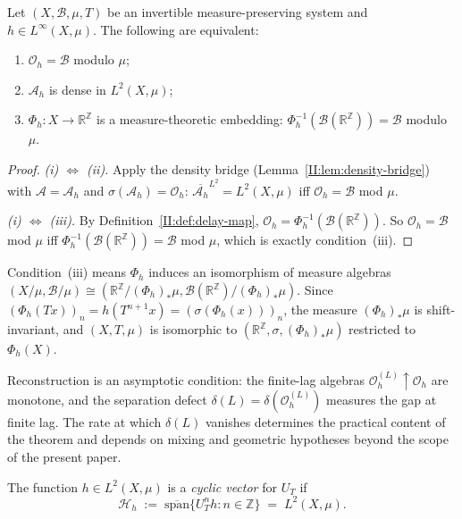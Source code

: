 \begin{theorem}
\label{II:thm:reconstruction}
Let $(X, \mathcal{B}, \mu, T)$ be an invertible measure-preserving system and
$h \in L^\infty(X, \mu)$.  The following are equivalent:
\begin{enumerate}[label=(\roman*)]
  \item $\mathcal{O}_h = \mathcal{B}$ modulo $\mu$;
  \item $\mathcal{A}_h$ is dense in $L^2(X, \mu)$;
  \item $\Phi_h : X \to \mathbb{R}^\mathbb{Z}$ is a measure-theoretic embedding:
    $\Phi_h^{-1}(\mathcal{B}(\mathbb{R}^\mathbb{Z})) = \mathcal{B}$ modulo $\mu$.
\end{enumerate}
\end{theorem}

\begin{proof}
\emph{(i) $\Leftrightarrow$ (ii).}
Apply the density bridge (Lemma~\ref{II:lem:density-bridge}) with
$\mathcal{A} = \mathcal{A}_h$ and $\sigma(\mathcal{A}_h) = \mathcal{O}_h$:
$\overline{\mathcal{A}_h}^{L^2} = L^2(X, \mu)$ iff $\mathcal{O}_h = \mathcal{B}$
mod $\mu$.

\emph{(i) $\Leftrightarrow$ (iii).}
By Definition~\ref{II:def:delay-map},
$\mathcal{O}_h = \Phi_h^{-1}(\mathcal{B}(\mathbb{R}^\mathbb{Z}))$.
So $\mathcal{O}_h = \mathcal{B}$ mod $\mu$ iff
$\Phi_h^{-1}(\mathcal{B}(\mathbb{R}^\mathbb{Z})) = \mathcal{B}$ mod $\mu$,
which is exactly condition~(iii).
\end{proof}

Condition~(iii) means $\Phi_h$ induces an isomorphism of measure algebras
$(X/\mu, \mathcal{B}/\mu) \cong (\mathbb{R}^\mathbb{Z}/(\Phi_h)_*\mu,
\mathcal{B}(\mathbb{R}^\mathbb{Z})/(\Phi_h)_*\mu)$.
Since $(\Phi_h(Tx))_n = h(T^{n+1}x) = (\sigma(\Phi_h(x)))_n$, the measure
$(\Phi_h)_*\mu$ is shift-invariant, and $(X, T, \mu)$ is isomorphic to
$(\mathbb{R}^\mathbb{Z}, \sigma, (\Phi_h)_*\mu)$ restricted to $\Phi_h(X)$.

Reconstruction is an asymptotic condition: the finite-lag algebras
$\mathcal{O}_h^{(L)} \uparrow \mathcal{O}_h$ are monotone, and the
separation defect $\delta(L) = \delta(\mathcal{O}_h^{(L)})$ measures
the gap at finite lag.  The rate at which $\delta(L)$ vanishes
determines the practical content of the theorem and depends on
mixing and geometric hypotheses beyond the scope of the present paper.

\begin{definition}
\label{II:def:cyclic}
The function $h \in L^2(X, \mu)$ is a \emph{cyclic vector} for $U_T$ if
\[
  \mathcal{H}_h
  \;:=\;
  \overline{\mathrm{span}}\!\bigl\{U_T^n h : n \in \mathbb{Z}\bigr\}
  \;=\; L^2(X, \mu).
\]
\end{definition}

